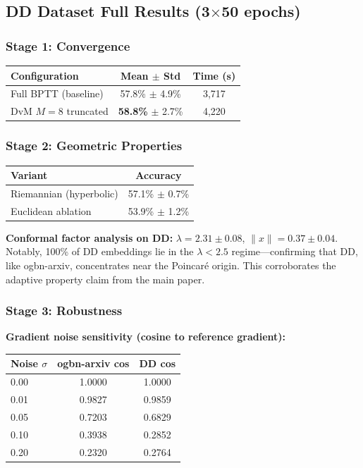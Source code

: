 \documentclass[a4paper,11pt]{article}
\begin{document}
\subsection{DD Dataset Full Results (3$\times$50 epochs)}

\subsubsection*{Stage 1: Convergence}
\begin{center}
\begin{tabular}{lcc}
\toprule
\textbf{Configuration} & \textbf{Mean $\pm$ Std} & \textbf{Time (s)} \\
\midrule
Full BPTT (baseline) & 57.8\% $\pm$ 4.9\% & 3,717 \\
DvM $M{=}8$ truncated & \textbf{58.8\%} $\pm$ 2.7\% & 4,220 \\
\bottomrule
\end{tabular}
\end{center}

\subsubsection*{Stage 2: Geometric Properties}
\begin{center}
\begin{tabular}{lc}
\toprule
\textbf{Variant} & \textbf{Accuracy} \\
\midrule
Riemannian (hyperbolic) & 57.1\% $\pm$ 0.7\% \\
Euclidean ablation & 53.9\% $\pm$ 1.2\% \\
\bottomrule
\end{tabular}
\end{center}

\textbf{Conformal factor analysis on DD:} $\lambda = 2.31 \pm 0.08$, $\|x\| = 0.37 \pm 0.04$. Notably, 100\% of DD embeddings lie in the $\lambda < 2.5$ regime---confirming that DD, like ogbn-arxiv, concentrates near the Poincar\'e origin. This corroborates the adaptive property claim from the main paper.

\subsubsection*{Stage 3: Robustness}

\textbf{Gradient noise sensitivity (cosine to reference gradient):}
\begin{center}
\begin{tabular}{lcc}
\toprule
\textbf{Noise $\sigma$} & \textbf{ogbn-arxiv cos} & \textbf{DD cos} \\
\midrule
0.00 & 1.0000 & 1.0000 \\
0.01 & 0.9827 & 0.9859 \\
0.05 & 0.7203 & 0.6829 \\
0.10 & 0.3938 & 0.2852 \\
0.20 & 0.2320 & 0.2764 \\
\bottomrule
\end{tabular}
\end{center}
\end{document}

